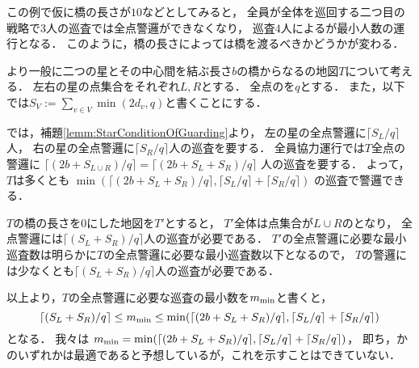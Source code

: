 この例で仮に橋の長さが$10$などとしてみると，
全員が全体を巡回する二つ目の戦略で$3$人の巡査では全点警邏ができなくなり，
巡査$4$人による{\separatedPatroll}が最小人数の運行となる．
このように，橋の長さによっては橋を渡るべきかどうかが変わる．

より一般に二つの星とその中心間を結ぶ長さ$b$の橋からなる{\graphTree}の地図$T$について考える．
左右の星の点集合をそれぞれ$L, R$とする．
全点の{\maxIdletime}を$q$とする．
また，以下では$S_V := \sum_{v \in V} \min(2d_v, q)$と書くことにする．
\newcommand{\lrceil}[1]{\lceil{#1}\rceil}

{\separatedPatroll}では，補題\ref{lemm:StarConditionOfGuarding}より，
左の星の全点警邏に$\lrceil{S_L / q}$人，
右の星の全点警邏に$\lrceil{S_R / q}$人の巡査を要する．
全員協力運行では$T$全点の警邏に
$\lrceil{( 2b + S_{L \cup R} ) / q}
 = \lrceil{( 2b + S_L + S_R ) / q}$%
人の巡査を要する．
よって，$T$は多くとも
$\min(
  \lrceil{( 2b + S_L + S_R ) / q},
  \lrceil{S_L / q} + \lrceil{S_R / q} )$%
の巡査で警邏できる．

$T$の橋の長さを$0$にした地図を$T'$とすると，
$T'$全体は点集合が$L \cup R$の{\graphStar}となり，
全点警邏には$\lrceil{(S_L + S_R) / q}$人の巡査が必要である．
$T'$の全点警邏に必要な最小巡査数は明らかに$T$の全点警邏に必要な最小巡査数以下となるので，
$T$の警邏には少なくとも$\lrceil{(S_L + S_R) / q}$人の巡査が必要である．

以上より，$T$の全点警邏に必要な巡査の最小数を$m_{\rm min}$と書くと，
\[
  \lrceil{(S_L + S_R) / q}
    \leq m_{\rm min}
    \leq \min(
        \lrceil{( 2b + S_L + S_R ) / q},
        \lrceil{S_L / q} + \lrceil{S_R / q} )
\]
となる．
我々は
$m_{\rm min} = \min(
        \lrceil{( 2b + S_L + S_R ) / q},
        \lrceil{S_L / q} + \lrceil{S_R / q} )$，
即ち，{\separatedPatroll}か{\cooperativePatroll}のいずれかは最適であると予想しているが，これを示すことはできていない．

